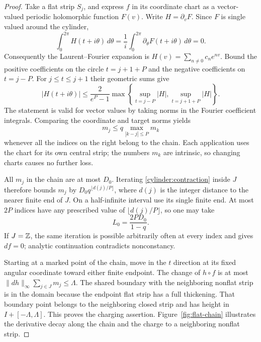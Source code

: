 \begin{proof}
Take a flat strip $S_j$, and express $f$ in its coordinate chart as
a vector-valued periodic holomorphic function $F(v)$.  Write
$H=\partial_vF$.  Since $F$ is single valued around the cylinder,
\[
 \int_0^{2\pi}H(t+i\theta)\,d\theta
   =\frac1i\int_0^{2\pi}\partial_\theta F(t+i\theta)\,d\theta=0.
\]
Consequently the Laurent--Fourier expansion is
$H(v)=\sum_{n\ne0}c_ne^{nv}$.  Bound the positive coefficients on
the circle $t=j+1+P$ and the negative coefficients on $t=j-P$.
For $j\leq t\leq j+1$ their geometric sums give
\[
 |H(t+i\theta)|\leq
 \frac{2}{e^P-1}
 \max\left\{\sup_{t=j-P}|H|,\sup_{t=j+1+P}|H|\right\}.
\]
The statement is valid for vector values by taking norms in the
Fourier coefficient integrals.  Comparing the coordinate and target
norms yields
\begin{equation}\label{cylinder:contraction}
 m_j\leq q\max_{|k-j|\leq P}m_k
\end{equation}
whenever all the indices on the right belong to the chain.  Each
application uses the chart for its own central strip; the numbers
$m_k$ are intrinsic, so changing charts causes no further loss.

All $m_j$ in the chain are at most $D_0$.  Iterating
\eqref{cylinder:contraction} inside $J$ therefore bounds $m_j$ by
$D_0q^{\lfloor d(j)/P\rfloor}$, where $d(j)$ is the integer distance
to the nearer finite end of $J$.  On a half-infinite interval use its
single finite end.  At most $2P$ indices have any prescribed value of
$\lfloor d(j)/P\rfloor$, so one may take
\[
 L_0=\frac{2PD_0}{1-q}.
\]
If $J=\mathbb Z$, the same iteration is possible arbitrarily often at every
index and gives $df=0$; analytic continuation contradicts
nonconstancy.

Starting at a marked point of the chain, move in the $t$ direction
at its fixed angular coordinate toward either finite endpoint.
The change of $h\circ f$ is at most
$\|dh\|_\infty\sum_{j\in J}m_j\leq\Lambda$.
The shared boundary with the neighboring nonflat strip is in the
domain because the endpoint flat strip has a full thickening.
That boundary point belongs to the neighboring closed strip and has
height in $I+[-\Lambda,\Lambda]$.  This proves the charging assertion.
Figure~\ref{fig:flat-chain} illustrates the derivative decay along the
chain and the charge to a neighboring nonflat strip.
\end{proof}



